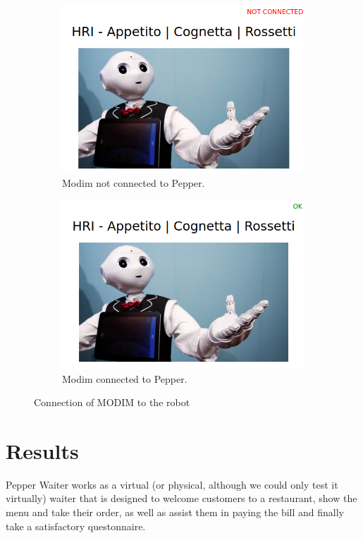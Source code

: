 \documentclass[12pt, letterpaper, twoside]{article}
\begin{document}
\begin{figure}[h]
	\centering
	\begin{subfigure}{.5\textwidth}
	  \centering
	  \includegraphics[width=1\linewidth]{img/modim_notok.png}
	  \caption{Modim not connected to Pepper.}
	  \label{fig:conn_notok}
	\end{subfigure}%
	\begin{subfigure}{.5\textwidth}
	  \centering
	  \includegraphics[width=1\linewidth]{img/modim_ok.png}
	  \caption{Modim connected to Pepper.}
	  \label{fig:conn_ok}
	\end{subfigure}
	\caption{Connection of MODIM to the robot}
	\label{fig:modim_connection}
\end{figure}

\newpage
\section{Results}
Pepper Waiter works as a virtual (or physical, although we could only test it virtually) waiter that is designed to welcome customers to a restaurant, show the menu and take their order, as well as assist them in paying the bill and finally take a satisfactory questonnaire. \\
\end{document}
